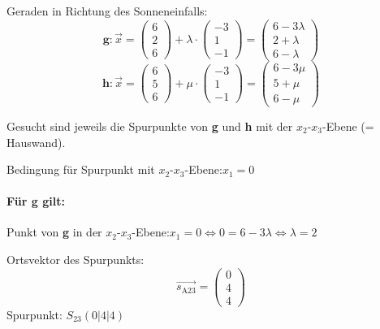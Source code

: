 \documentclass{ajc}
\numberwithin{equation}{subsection}
\begin{document}
	Geraden in Richtung des Sonneneinfalls:
	\begin{equation}
		\mathbf{g}: \overrightarrow{x}=\left(\begin{array}{r} 6 \\ 2 \\ 6\end{array}\right) + \lambda \cdot \left(\begin{array}{r} -3 \\ 1 \\ -1\end{array}\right) = \left(\begin{array}{r} 6 - 3 \lambda \\ 2 + \lambda \\ 6 - \lambda\end{array}\right)
	\end{equation}
	\begin{equation}
		\mathbf{h}: \overrightarrow{x}=\left(\begin{array}{r} 6 \\ 5 \\ 6\end{array}\right) + \mu \cdot \left(\begin{array}{r} -3 \\ 1 \\ -1\end{array}\right) = \left(\begin{array}{r} 6 - 3 \mu \\ 5 + \mu \\ 6 - \mu\end{array}\right)
	\end{equation}
	
	Gesucht sind jeweils die Spurpunkte von \textbf{g} und \textbf{h} mit der $x_2\text{-}x_3$-Ebene (= Hauswand).
	
	Bedingung für Spurpunkt mit $x_2$-$x_3$-Ebene:\quad $x_1 = 0$
	
	\paragraph{Für g gilt:} 
	
	Punkt von \textbf{g} in der $x_2\text{-}x_3$-Ebene:\quad $x_1 = 0 \Leftrightarrow 0 = 6 - 3 \lambda \Leftrightarrow \lambda = 2$
	
	Ortsvektor des Spurpunkts: 
	\begin{equation}
		\overrightarrow{s_\text{A23}}=\left(\begin{array}{r} 0 \\ 4 \\ 4\end{array}\right)
	\end{equation}
	Spurpunkt: $S_\text{23}(0|4|4)$
	
\end{document}
